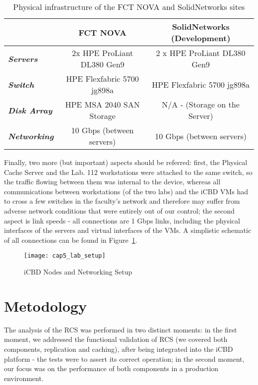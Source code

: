 \begin{table}[htpb]
\centering
\begin{tabular}{lcc}
                             & \textbf{FCT NOVA}          & \textbf{SolidNetworks (Development)}              \\ \hline
\textit{\textbf{Servers}}    & 2x HPE ProLiant DL380 Gen9 & 2 x HPE ProLiant DL380 Gen9   \\
\textit{\textbf{Switch}}     & HPE Flexfabric 5700 jg898a & HPE Flexfabric 5700 jg898a    \\
\textit{\textbf{Disk Array}} & HPE MSA 2040 SAN Storage   & N/A - (Storage on the Server) \\
\textit{\textbf{Networking}} & 10 Gbps (between servers)  & 10 Gbps (between servers)     \\ \hline
\end{tabular}
\caption{Physical infrastructure of the FCT NOVA and SolidNetworks sites}
\end{table}

Finally, two more (but important) aspects should be referred: first, the Physical Cache Server and the Lab. 112 workstations were attached to the same switch, so the traffic flowing between them was internal to the device, whereas all communications between workstations (of the two labs) and the iCBD VMs had to cross a few switches in the faculty’s network and therefore may suffer from adverse network conditions that were entirely out of our control; the second aspect is link speeds - all connections are 1 Gbps links, including the physical interfaces of the servers and virtual interfaces of the VMs. A simplistic schematic of all connections can be found in Figure~\ref{fig:eval_setup}.

\begin{figure}[htbp]
	\centering
	\texttt{[image: cap5\_lab\_setup]}
	\caption{iCBD Nodes and Networking Setup}
	\label{fig:eval_setup}
\end{figure}




\section{Metodology}
\label{sec:eval_method}

The analysis of the RCS was performed in two distinct moments: in the first moment, we addressed the functional validation of RCS (we covered both components, replication and caching), after being integrated into the iCBD platform - the tests were to assert its correct operation; in the second moment, our focus was on the performance of both components in a production environment.

